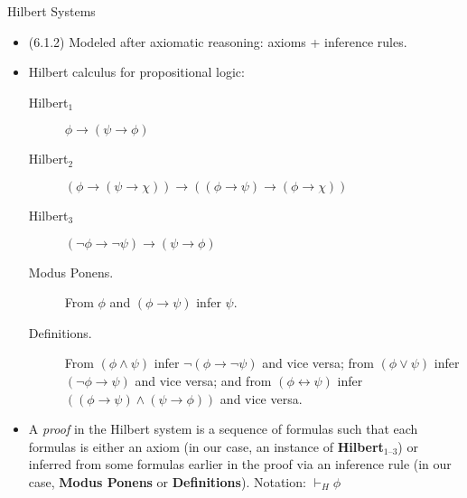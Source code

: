 \begin{frame}{Hilbert Systems}

	\begin{itemize}
	
		\item (6.1.2) Modeled after axiomatic reasoning: axioms + inference rules.
	
		\item Hilbert calculus for propositional logic:
		
		 \begin{description}

						\item[Hilbert$_1$] $\phi\to (\psi\to \phi)$

						\item[Hilbert$_2$] $(\phi\to (\psi\to \chi))\to((\phi\to \psi)\to (\phi\to \chi))$

						\item[Hilbert$_3$] $(\neg \phi\to \neg \psi)\to (\psi\to\phi)$				
						
						\item[Modus Ponens.] From $\phi$ and $(\phi\to\psi)$ infer $\psi$.
						
						\item[Definitions.] From $(\phi\land\psi)$ infer $\neg(\phi\to\neg\psi)$ and vice versa; from $(\phi\lor\psi)$ infer  $(\neg\phi\to\psi)$ and vice versa; and from $(\phi\leftrightarrow\psi)$ infer $((\phi\to\psi)\land(\psi\to\phi))$ and vice versa.

		\end{description}
		
		\item A \emph{proof} in the Hilbert system is a sequence of formulas such that each formulas is either an axiom (in our case, an instance of \textbf{Hilbert}$_\text{1--3}$) or inferred from some formulas earlier in the proof via an inference rule (in our case, \textbf{Modus Ponens}  or \textbf{Definitions}). Notation: $\vdash_H\phi$
	
	\end{itemize}

\end{frame}

